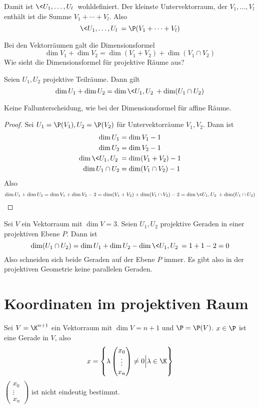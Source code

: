 \documentclass{mycourse}
\begin{document}
Damit ist $\<U_1,\dotsc, U_l\>$ wohldefiniert.
Der kleinste Untervektorraum, der $V_1,\dotsc, V_l$ enthält ist die Summe $V_1 + \dotsb + V_l$.
Also
\[
	\<U_1,\dotsc,U_l\> = \P(V_1+\dotsb +V_l)
\]

Bei den Vektorräumen galt die Dimensionsformel
\[
	\dim V_1 + \dim V_2 = \dim (V_1 + V_2) + \dim (V_1\cap V_2)
\]
Wie sieht die Dimensionsformel für projektive Räume aus?

\begin{prop}
	\label{prop:15.4}
	Seien $U_1, U_2$ projektive Teilräume.
	Dann gilt
	\[
		\dim U_1 + \dim U_2 = \dim \<U_1,U_2\> + \dim ( U_1\cap U_2)
	\]
	\begin{note}
		Keine Fallunterscheidung, wie bei der Dimensionsformel für affine Räume.
	\end{note}
	\begin{proof}
		Sei $U_1 = \P(V_1), U_2 = \P(V_2)$ für Untervektorräume $V_1, V_2$.
		Dann ist
		\begin{align*}
			\dim U_1 &= \dim V_1 - 1\\
			\dim U_2 &= \dim V_2 - 1\\
			\dim \<U_1,U_2\> &= \dim (V_1 + V_2) - 1\\
			\dim U_1\cap U_2 &= \dim (V_1 \cap V_2) - 1\\
		\end{align*}
		Also
		\[
			\dim U_1 + \dim U_2 = \dim V_1 + \dim V_2 - 2 = \dim(V_1 + V_2) + \dim (V_1 \cap V_2) - 2 = \dim \<U_1,U_2\> + \dim (U_1\cap U_2)
		\]
	\end{proof}
\end{prop}

\begin{ex}
	Sei $V$ ein Vektorraum mit $\dim V = 3$.
	Seien $U_1, U_2$ projektive Geraden in einer projektiven Ebene $P$.
	Dann ist
	\[
		\dim (U_1 \cap U_2) = \dim U_1 + \dim U_2 - \dim \<U_1,U_2\> = 1 + 1 - 2 = 0
	\]
	Also schneiden sich beide Geraden auf der Ebene $P$ immer.
	Es gibt also in der projektiven Geometrie keine parallelen Geraden.
\end{ex}


\section{Koordinaten im projektiven Raum}


Sei $V = \K^{n+1}$ ein Vektorraum mit $\dim V=n+1$ und $\P = \P(V)$.
$x\in \P$ ist eine Gerade in $V$, also
\[
	x = \left\{ \lambda \begin{pmatrix}x_0\\\vdots \\ x_n\end{pmatrix}\neq 0 \Big| \lambda \in \K\right\}
\]
$\left(\begin{smallmatrix}x_0\\\vdots \\x_n\end{smallmatrix}\right)$ ist nicht eindeutig bestimmt.
\end{document}
